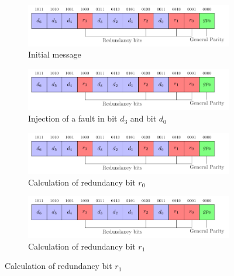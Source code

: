 \begin{figure}[ht]
    \centering
    \begin{subfigure}[b]{0.49\textwidth}
        \includegraphics[width=\textwidth, page=5]{c5_countermeasures_dift/img/secded.pdf}
        \caption{Initial message}
        \label{fig:secded_faulted_2bits_1}
    \end{subfigure}
    \hfill
    \begin{subfigure}[b]{0.49\textwidth}
        \includegraphics[width=\textwidth, page=12]{c5_countermeasures_dift/img/secded.pdf}
        \caption{Injection of a fault in bit $d_3$ and bit $d_0$}
        \label{fig:secded_faulted_2bits_2}
    \end{subfigure}
    \hfill
    \begin{subfigure}[b]{0.49\textwidth}
        \includegraphics[width=\textwidth, page=13]{c5_countermeasures_dift/img/secded.pdf}
        \caption{Calculation of redundancy bit $r_0$}
        \label{fig:secded_faulted_2bits_3}
    \end{subfigure}
    \hfill
    \begin{subfigure}[b]{0.49\textwidth}
        \includegraphics[width=\textwidth, page=14]{c5_countermeasures_dift/img/secded.pdf}
        \caption{Calculation of redundancy bit $r_1$}
        \label{fig:secded_faulted_2bits_4}

\end{subfigure}
\end{figure}
